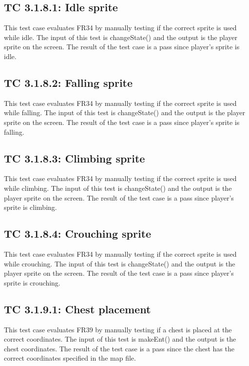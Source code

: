 \documentclass[12pt, titlepage]{article}
\begin{document}
\subsection*{TC 3.1.8.1: Idle sprite}

This test case evaluates FR34 by manually testing if the correct sprite is used while idle. The input of this test is changeState() and the output is the player sprite on the screen. The result of the test case is a pass since player's sprite is idle.

\subsection*{TC 3.1.8.2: Falling sprite}

This test case evaluates FR34 by manually testing if the correct sprite is used while falling. The input of this test is changeState() and the output is the player sprite on the screen. The result of the test case is a pass since player's sprite is falling.

\subsection*{TC 3.1.8.3: Climbing sprite}

This test case evaluates FR34 by manually testing if the correct sprite is used while climbing. The input of this test is changeState() and the output is the player sprite on the screen. The result of the test case is a pass since player's sprite is climbing.

\subsection*{TC 3.1.8.4: Crouching sprite}

This test case evaluates FR34 by manually testing if the correct sprite is used while crouching. The input of this test is changeState() and the output is the player sprite on the screen. The result of the test case is a pass since player's sprite is crouching.

\subsection*{TC 3.1.9.1: Chest placement}

This test case evaluates FR39 by manually testing if a chest is placed at the correct coordinates. The input of this test is makeEnt() and the output is the chest coordinates. The result of the test case is a pass since the chest has the correct coordinates specified in the map file.
\end{document}
